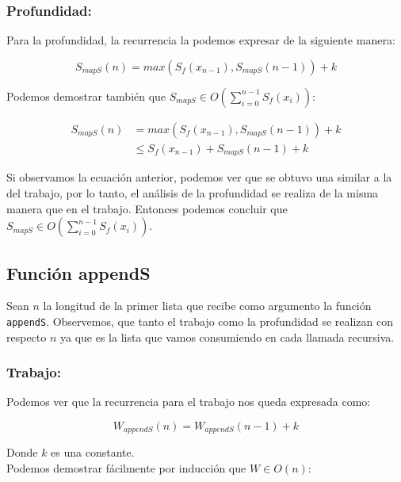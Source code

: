 \documentclass[11pt]{article}
\begin{document}
\subsubsection{Profundidad:}

Para la profundidad, la recurrencia la podemos expresar de la siguiente manera:

\begin{equation*}
    S_{mapS}(n) = max(S_f(x_{n- 1}), S_{mapS}(n - 1)) + k
\end{equation*}

Podemos demostrar también que $ S_{mapS} \in O\left(\displaystyle\sum_{i=0}^{n - 1}S_f(x_i)\right) $:

\begin{align*}
    S_{mapS}(n) & = max(S_f(x_{n- 1}), S_{mapS}(n - 1)) + k \\
               & \leq S_f(x_{n- 1}) + S_{mapS}(n - 1) + k
\end{align*}

Si observamos la ecuación anterior, podemos ver que se obtuvo una similar
a la del trabajo, por lo tanto, el análisis de la profundidad se realiza
de la misma manera que en el trabajo. Entonces podemos concluir que 
$ S_{mapS} \in O\left(\displaystyle\sum_{i=0}^{n - 1}S_f(x_i)\right) $.


\subsection{Función appendS}

Sean $n$ la longitud de la primer lista que recibe como argumento la función \texttt{appendS}.
Observemos, que tanto el trabajo como la profundidad se realizan con respecto $n$
ya que es la lista que vamos consumiendo en cada llamada recursiva.
 
\subsubsection{Trabajo:}
Podemos ver que la recurrencia para el trabajo nos queda expresada como:

\begin{equation*}
    W_{appendS}(n) = W_{appendS}(n - 1) + k
\end{equation*}

Donde $k$ es una constante. \\

Podemos demostrar fácilmente por inducción que $W \in O(n)$:
\end{document}
